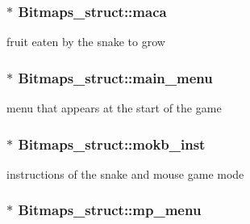 \subsubsection[{\texorpdfstring{maca}{maca}}]{$\ast$ Bitmaps\+\_\+struct\+::maca}\hypertarget{group__graphics_ga90d36683bc99f1ee114191f6ae238990}{}\label{group__graphics_ga90d36683bc99f1ee114191f6ae238990}


fruit eaten by the snake to grow 

\subsubsection[{\texorpdfstring{main\+\_\+menu}{main_menu}}]{$\ast$ Bitmaps\+\_\+struct\+::main\+\_\+menu}\hypertarget{group__graphics_ga024eb6d4380a6df2938202e45547c241}{}\label{group__graphics_ga024eb6d4380a6df2938202e45547c241}


menu that appears at the start of the game 

\subsubsection[{\texorpdfstring{mokb\+\_\+inst}{mokb_inst}}]{$\ast$ Bitmaps\+\_\+struct\+::mokb\+\_\+inst}\hypertarget{group__graphics_gaa403b7ac82d3c61224b7064f29790bd3}{}\label{group__graphics_gaa403b7ac82d3c61224b7064f29790bd3}


instructions of the snake and mouse game mode 

\subsubsection[{\texorpdfstring{mp\+\_\+menu}{mp_menu}}]{$\ast$ Bitmaps\+\_\+struct\+::mp\+\_\+menu}\hypertarget{group__graphics_ga65a5f6d63fc1498c0bace1310dac202f}{}\label{group__graphics_ga65a5f6d63fc1498c0bace1310dac202f}

